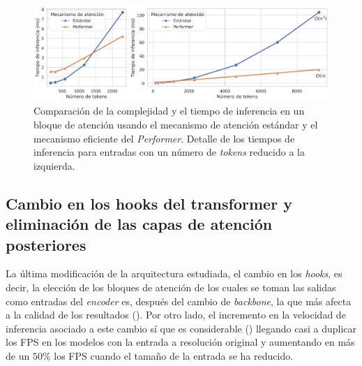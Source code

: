 \begin{figure}[H]
\centering
\includegraphics[width=\linewidth]{imagenes/Resultados/complejidad_mecanismo_atencion.png} 
\captionsetup{width=.95\linewidth}
\caption{Comparación de la complejidad y el tiempo de inferencia en un bloque de atención usando el mecanismo de atención estándar y el mecanismo eficiente del \textit{Performer}. Detalle de los tiempos de inferencia para entradas con un número de \textit{tokens} reducido a la izquierda.}
\label{fig:resultados-complejidad-mec-atencion}
\end{figure}

















\subsection{Cambio en los hooks del transformer y eliminación de las capas de atención posteriores}\label{resultados-cuantitativos-hooks}
La última modificación de la arquitectura estudiada, el cambio en los \textit{hooks}, es decir, la elección de los bloques de atención de los cuales se toman las salidas como entradas del \textit{encoder} es, después del cambio de \textit{backbone}, la que más afecta a la calidad de los resultados (). Por otro lado, el incremento en la velocidad de inferencia asociado a este cambio sí que es considerable () llegando casi a duplicar los FPS en los modelos con la entrada a resolución original y aumentando en más de un $50\%$ los FPS cuando el tamaño de la entrada se ha reducido.

